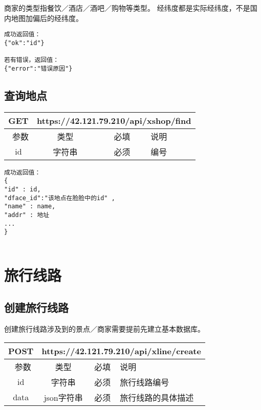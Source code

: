 \documentclass[cs4size]{ctexartutf8}
\begin{document}
商家的类型指餐饮／酒店／酒吧／购物等类型。
经纬度都是实际经纬度，不是国内地图加偏后的经纬度。

\begin{verbatim}
成功返回值：
{"ok":"id"}

若有错误，返回值：
{"error":"错误原因"}
\end{verbatim}



\subsection{查询地点}

\begin{table}[H]
   \begin{center}
\begin{tabular}{|c|c|c|p{12cm}|}
\hline
GET & \multicolumn{3}{|c|}{https://42.121.79.210/api/xshop/find} \\
\hline\hline
 \  参数  & 类型 & 必填 &  说明  \\
 \hline
 id  & 字符串 & 必须 &  编号\\
\hline
\end{tabular}
   \end{center}
\end{table}

\begin{verbatim}
成功返回值：
{
"id" : id,
"dface_id":"该地点在脸脸中的id" ,
"name" : name,
"addr" : 地址
...
}


\end{verbatim}


\section{旅行线路}

\subsection{创建旅行线路}

创建旅行线路涉及到的景点／商家需要提前先建立基本数据库。

\begin{table}[H]
   \begin{center}
\begin{tabular}{|c|c|c|p{12cm}|}
\hline
POST & \multicolumn{3}{|c|}{https://42.121.79.210/api/xline/create} \\
\hline\hline
 \  参数  & 类型 & 必填 &  说明  \\
 \hline
 id  & 字符串 & 必须 &  旅行线路编号\\
\hline
 data  & json字符串 & 必须 &  旅行线路的具体描述\\
\hline
\end{tabular}
   \end{center}
\end{table}
\end{document}
